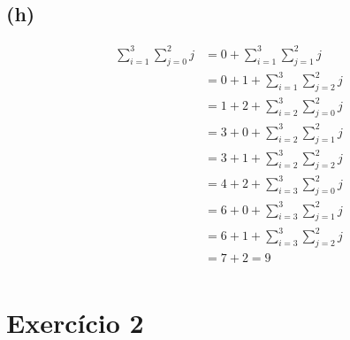 \documentclass{article}
\begin{document}
\subsection*{(h)}
\begin{equation} \label{eq8}
\begin{split}
\sum\limits_{i=1}^{3}\sum\limits_{j=0}^{2}j & =  0 + \sum\limits_{i=1}^{3}\sum\limits_{j=1}^{2}j \\
& =  0 + 1 + \sum\limits_{i=1}^{3}\sum\limits_{j=2}^{2}j \\
& =  1 + 2 + \sum\limits_{i=2}^{3}\sum\limits_{j=0}^{2}j \\ 
& =  3 + 0 + \sum\limits_{i=2}^{3}\sum\limits_{j=1}^{2}j \\ 
& =  3 + 1 + \sum\limits_{i=2}^{3}\sum\limits_{j=2}^{2}j \\ 
& =  4 + 2 + \sum\limits_{i=3}^{3}\sum\limits_{j=0}^{2}j \\ 
& =  6 + 0 + \sum\limits_{i=3}^{3}\sum\limits_{j=1}^{2}j \\ 
& =  6 + 1 + \sum\limits_{i=3}^{3}\sum\limits_{j=2}^{2}j \\ 
& =  7 + 2 = 9\\ 
\end{split}
\end{equation}

\section{Exercício 2}
\end{document}
